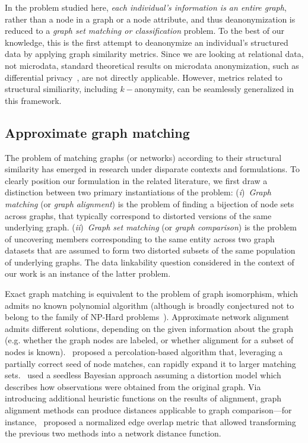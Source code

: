In the problem studied here, \emph{each individual's information is an entire graph}, rather than a node in a graph or a node attribute, and thus deanonymization is reduced to a \emph{graph set matching or classification} problem.
To the best of our knowledge, this is the first attempt to deanonymize an individual's structured data by applying graph similarity metrics.
Since we are looking at relational data, not microdata, standard theoretical results on microdata anonymization, such as differential privacy~\citep{dwork2006calibrating}, are not directly applicable.
However, metrics related to structural similiarity, including $k-$anonymity, can be seamlessly generalized in this framework.

\subsection{Approximate graph matching}
The problem of matching graphs (or networks) according to their structural similarity has emerged in research under disparate contexts and formulations. To clearly position our formulation in the related literature, we first draw a distinction between two primary instantiations of the problem: (\emph{i})~\emph{Graph matching} (or \emph{graph alignment}) is the problem of finding a bijection of node sets across graphs, that typically correspond to distorted versions of the same underlying graph. (\emph{ii})~\emph{Graph set matching} (or \emph{graph comparison}) is the problem of uncovering members corresponding to the same entity across two graph datasets that are assumed to form two distorted subsets of the same population of underlying graphs. The data linkability question considered in the context of our work is an instance of the latter problem.

Exact graph matching is equivalent to the problem of graph isomorphism, which admits no known polynomial algorithm (although is broadly conjectured not to belong to the family of NP-Hard problems~\citep{schoening88}). Approximate network alignment admits different solutions, depending on the given information about the graph (e.g. whether the graph nodes are labeled, or whether alignment for a subset of nodes is known).~\textcite{kazemi15} proposed a percolation-based algorithm that, leveraging a partially correct seed of node matches, can rapidly expand it to larger matching sets.~\textcite{pedarsani13} used a seedless Bayesian approach assuming a distortion model which describes how observations were obtained from the original graph. Via introducing additional heuristic functions on the results of alignment, graph alignment methods can produce distances applicable to graph comparison---for instance,~\textcite{mishinev20} proposed a normalized edge overlap metric that allowed transforming the previous two methods into a network distance function.

